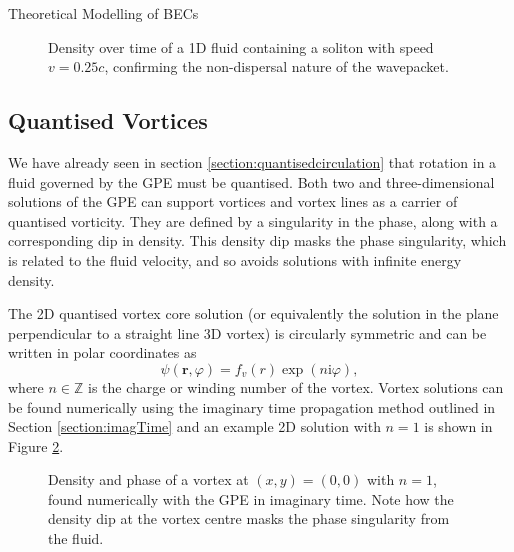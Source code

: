 \begin{chapter}{\label{cha:theoretical_model}Theoretical Modelling of BECs}
\begin{figure}[!ht]
  \caption{Density over time of a 1D fluid containing a soliton with speed $v=0.25c$, confirming the non-dispersal nature of the wavepacket.}\label{fig_solitonmove}
 \end{figure}


\subsection{\label{section:vortices} Quantised Vortices}
We have already seen in section \ref{section:quantisedcirculation} that rotation in a fluid governed by the GPE must be quantised. Both two and three-dimensional solutions of the GPE can support vortices and vortex lines as a carrier of quantised vorticity. They are defined by a singularity in the phase, along with a corresponding dip in density. This density dip masks the phase singularity, which is related to the fluid velocity, and so avoids solutions with infinite energy density.

The 2D quantised vortex core solution (or equivalently the solution in the plane perpendicular to a straight line 3D vortex) is circularly symmetric and can be written in polar coordinates as
	\begin{equation}\label{eq_vortexsol}
	\psi(\mathbf{r},\varphi) = f_v(r)\exp(n\mathrm{i}\varphi),
	\end{equation}
where $n\in\mathbb{Z}$ is the charge or winding number of the vortex. Vortex solutions can be found numerically using the imaginary time propagation method outlined in Section \ref{section:imagTime} and an example 2D solution with $n=1$ is shown in Figure \ref{fig_vortexdensphase}.

\begin{figure}[!ht]
	\centering
  \caption{Density and phase of a vortex at $(x,y) = (0,0)$ with $n=1$, found numerically with the GPE in imaginary time. Note how the density dip at the vortex centre masks the phase singularity from the fluid. }\label{fig_vortexdensphase}
 \end{figure}


\end{chapter}
